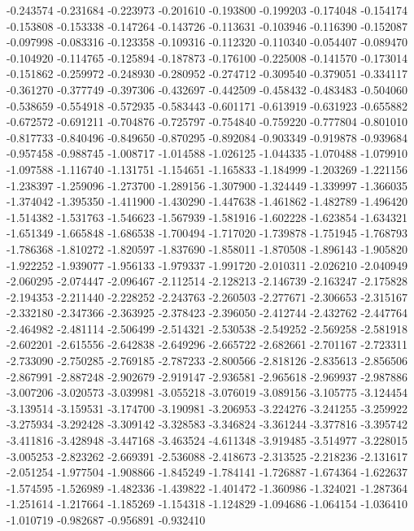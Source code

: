 -0.243574
-0.231684
-0.223973
-0.201610
-0.193800
-0.199203
-0.174048
-0.154174
-0.153808
-0.153338
-0.147264
-0.143726
-0.113631
-0.103946
-0.116390
-0.152087
-0.097998
-0.083316
-0.123358
-0.109316
-0.112320
-0.110340
-0.054407
-0.089470
-0.104920
-0.114765
-0.125894
-0.187873
-0.176100
-0.225008
-0.141570
-0.173014
-0.151862
-0.259972
-0.248930
-0.280952
-0.274712
-0.309540
-0.379051
-0.334117
-0.361270
-0.377749
-0.397306
-0.432697
-0.442509
-0.458432
-0.483483
-0.504060
-0.538659
-0.554918
-0.572935
-0.583443
-0.601171
-0.613919
-0.631923
-0.655882
-0.672572
-0.691211
-0.704876
-0.725797
-0.754840
-0.759220
-0.777804
-0.801010
-0.817733
-0.840496
-0.849650
-0.870295
-0.892084
-0.903349
-0.919878
-0.939684
-0.957458
-0.988745
-1.008717
-1.014588
-1.026125
-1.044335
-1.070488
-1.079910
-1.097588
-1.116740
-1.131751
-1.154651
-1.165833
-1.184999
-1.203269
-1.221156
-1.238397
-1.259096
-1.273700
-1.289156
-1.307900
-1.324449
-1.339997
-1.366035
-1.374042
-1.395350
-1.411900
-1.430290
-1.447638
-1.461862
-1.482789
-1.496420
-1.514382
-1.531763
-1.546623
-1.567939
-1.581916
-1.602228
-1.623854
-1.634321
-1.651349
-1.665848
-1.686538
-1.700494
-1.717020
-1.739878
-1.751945
-1.768793
-1.786368
-1.810272
-1.820597
-1.837690
-1.858011
-1.870508
-1.896143
-1.905820
-1.922252
-1.939077
-1.956133
-1.979337
-1.991720
-2.010311
-2.026210
-2.040949
-2.060295
-2.074447
-2.096467
-2.112514
-2.128213
-2.146739
-2.163247
-2.175828
-2.194353
-2.211440
-2.228252
-2.243763
-2.260503
-2.277671
-2.306653
-2.315167
-2.332180
-2.347366
-2.363925
-2.378423
-2.396050
-2.412744
-2.432762
-2.447764
-2.464982
-2.481114
-2.506499
-2.514321
-2.530538
-2.549252
-2.569258
-2.581918
-2.602201
-2.615556
-2.642838
-2.649296
-2.665722
-2.682661
-2.701167
-2.723311
-2.733090
-2.750285
-2.769185
-2.787233
-2.800566
-2.818126
-2.835613
-2.856506
-2.867991
-2.887248
-2.902679
-2.919147
-2.936581
-2.965618
-2.969937
-2.987886
-3.007206
-3.020573
-3.039981
-3.055218
-3.076019
-3.089156
-3.105775
-3.124454
-3.139514
-3.159531
-3.174700
-3.190981
-3.206953
-3.224276
-3.241255
-3.259922
-3.275934
-3.292428
-3.309142
-3.328583
-3.346824
-3.361244
-3.377816
-3.395742
-3.411816
-3.428948
-3.447168
-3.463524
-4.611348
-3.919485
-3.514977
-3.228015
-3.005253
-2.823262
-2.669391
-2.536088
-2.418673
-2.313525
-2.218236
-2.131617
-2.051254
-1.977504
-1.908866
-1.845249
-1.784141
-1.726887
-1.674364
-1.622637
-1.574595
-1.526989
-1.482336
-1.439822
-1.401472
-1.360986
-1.324021
-1.287364
-1.251614
-1.217664
-1.185269
-1.154318
-1.124829
-1.094686
-1.064154
-1.036410
-1.010719
-0.982687
-0.956891
-0.932410
